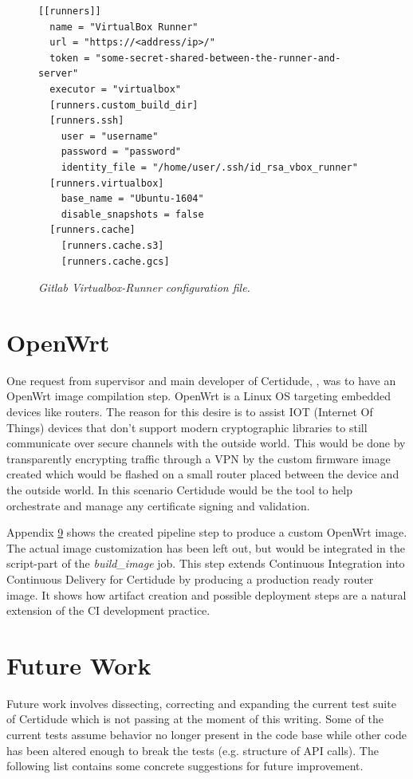 \pagebreak


\begin{figure}[H]
\centering
\begin{lstlisting}[frame=single, basicstyle=\small, linewidth=\textwidth]
[[runners]]
  name = "VirtualBox Runner"
  url = "https://<address/ip>/"
  token = "some-secret-shared-between-the-runner-and-server"
  executor = "virtualbox"
  [runners.custom_build_dir]
  [runners.ssh]
    user = "username"
    password = "password"
    identity_file = "/home/user/.ssh/id_rsa_vbox_runner"
  [runners.virtualbox]
    base_name = "Ubuntu-1604"
    disable_snapshots = false
  [runners.cache]
    [runners.cache.s3]
    [runners.cache.gcs]
\end{lstlisting}
\caption{\textit{Gitlab Virtualbox-Runner configuration file.}}
\label{fig:gitlab-runner-conf}
\end{figure}

\section{OpenWrt}\label{openwrt}

One request from supervisor and main developer of Certidude, \supervisor, was to have an OpenWrt image compilation step. OpenWrt is a Linux OS targeting embedded devices like routers.\cite{openwrt} The reason for this desire is to assist IOT (Internet Of Things) devices that don't support modern cryptographic libraries to still communicate over secure channels with the outside world. This would be done by transparently encrypting traffic through a VPN by the custom firmware image created which would be flashed on a small router placed between the device and the outside world. In this scenario Certidude would be the tool to help orchestrate and manage any certificate signing and validation. 

Appendix \hyperref[chapter:appendix-openwrt]{9} shows the created pipeline step to produce a custom OpenWrt image. The actual image customization has been left out, but would be integrated in the script-part of the \textit{build\_image} job.\cite{openwrt-build} This step extends Continuous Integration into Continuous Delivery for Certidude by producing a production ready router image. It shows how artifact creation and possible deployment steps are a natural extension of the CI development practice. 

\pagebreak

\section{Future Work} \label{future-work}
Future work involves dissecting, correcting and expanding the current test suite of Certidude which is not passing at the moment of this writing. Some of the current tests assume behavior no longer present in the code base while other code has been altered enough to break the tests (e.g. structure of API calls). The following list contains some concrete suggestions for future improvement.


